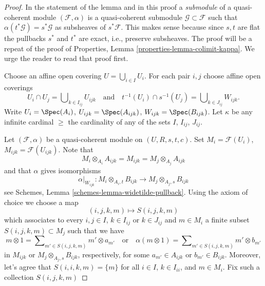 \begin{proof}
In the statement of the lemma and in this proof
a {\it submodule} of a quasi-coherent module $(\mathcal{F}, \alpha)$
is a quasi-coherent submodule $\mathcal{G} \subset \mathcal{F}$
such that $\alpha(t^*\mathcal{G}) = s^*\mathcal{G}$ as subsheaves of
$s^*\mathcal{F}$. This makes sense because since $s, t$ are flat the
pullbacks $s^*$ and $t^*$ are exact, i.e., preserve subsheaves.
The proof will be a repeat of the proof of
Properties, Lemma \ref{properties-lemma-colimit-kappa}.
We urge the reader to read that proof first.

\medskip\noindent
Choose an affine open covering $U = \bigcup_{i \in I} U_i$.
For each pair $i, j$ choose affine open coverings
$$
U_i \cap U_j = \bigcup\nolimits_{k \in I_{ij}} U_{ijk}
\quad\text{and}\quad
t^{-1}(U_i) \cap s^{-1}(U_j) = \bigcup\nolimits_{k \in J_{ij}} W_{ijk}.
$$
Write $U_i = \Spec(A_i)$, $U_{ijk} = \Spec(A_{ijk})$,
$W_{ijk} = \Spec(B_{ijk})$.
Let $\kappa$ be any infinite cardinal $\geq$ the cardinality
of any of the sets $I$, $I_{ij}$, $J_{ij}$.

\medskip\noindent
Let $(\mathcal{F}, \alpha)$ be a quasi-coherent module on $(U, R, s, t, c)$.
Set $M_i = \mathcal{F}(U_i)$, $M_{ijk} = \mathcal{F}(U_{ijk})$.
Note that
$$
M_i \otimes_{A_i} A_{ijk} = M_{ijk} = M_j \otimes_{A_j} A_{ijk}
$$
and that $\alpha$ gives isomorphisms
$$
\alpha|_{W_{ijk}} :
M_i \otimes_{A_i, t} B_{ijk}
\longrightarrow
M_j \otimes_{A_j, s} B_{ijk}
$$
see
Schemes, Lemma \ref{schemes-lemma-widetilde-pullback}.
Using the axiom of choice we choose a map
$$
(i, j, k, m) \mapsto S(i, j, k, m)
$$
which associates to every $i, j \in I$, $k \in I_{ij}$ or $k \in J_{ij}$
and $m \in M_i$ a finite subset $S(i, j, k, m) \subset M_j$
such that we have
$$
m \otimes 1 = \sum\nolimits_{m' \in S(i, j, k, m)} m' \otimes a_{m'}
\quad\text{or}\quad
\alpha(m \otimes 1) = \sum\nolimits_{m' \in S(i, j, k, m)} m' \otimes b_{m'}
$$
in $M_{ijk}$ or $M_j \otimes_{A_j, s} B_{ijk}$, respectively,
for some $a_{m'} \in A_{ijk}$ or $b_{m'} \in B_{ijk}$.
Moreover, let's agree that $S(i, i, k, m) = \{m\}$ for all
$i \in I$, $k \in I_{ii}$, and $m \in M_i$. Fix such a collection $S(i, j, k, m)$


\end{proof}
